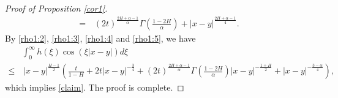 \documentclass[11pt,reqno]{amsart}
\numberwithin{equation}{section}
\newcommand{\1}{{\bf 1}}
\newcommand{\2}{{\bf 2}}
\begin{document}
\begin{proof}[Proof of Proposition \ref{cor1}]
\begin{equation}
\begin{split}
=&\, (2t)^{\frac{2H+\alpha-1}{\alpha}}\Gamma\left(\frac{1-2H}{\alpha}\right)+|x-y|^{\frac{2H+\alpha-1}{4}}.
\end{split}
\end{equation}
By \eqref{rho1:2}, \eqref{rho1:3}, \eqref{rho1:4}  and \eqref{rho1:5}, we have
\begin{align*}
&\int_0^\infty h(\xi) \cos\left(\xi|x-y|\right)d\xi\\
\leq&\, |x-y|^{\frac{H-1}{2}}\left(\frac{t}{1-H}+2t|x-y|^{-\frac34}
+(2t)^{\frac{2H+\alpha-1}{\alpha}}\Gamma\left(\frac{1-2H}{\alpha}\right)|x-y|^{-\frac{1+H}{2}}
+|x-y|^{-\frac{3-\alpha}{4}}\right),
\end{align*}
which implies \eqref{claim}.
The proof   is complete.
\end{proof}
\end{document}
